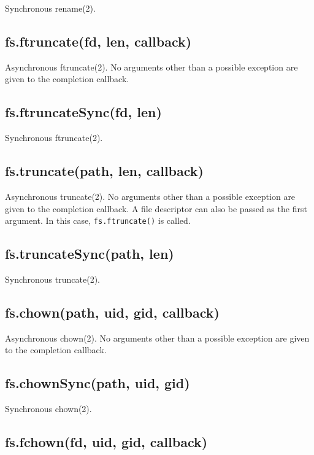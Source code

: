 Synchronous rename(2).

\subsection{fs.ftruncate(fd, len,
callback)}\label{fs.ftruncatefd-len-callback}

Asynchronous ftruncate(2). No arguments other than a possible exception
are given to the completion callback.

\subsection{fs.ftruncateSync(fd, len)}\label{fs.ftruncatesyncfd-len}

Synchronous ftruncate(2).

\subsection{fs.truncate(path, len,
callback)}\label{fs.truncatepath-len-callback}

Asynchronous truncate(2). No arguments other than a possible exception
are given to the completion callback. A file descriptor can also be
passed as the first argument. In this case, \texttt{fs.ftruncate()} is
called.

\subsection{fs.truncateSync(path, len)}\label{fs.truncatesyncpath-len}

Synchronous truncate(2).

\subsection{fs.chown(path, uid, gid,
callback)}\label{fs.chownpath-uid-gid-callback}

Asynchronous chown(2). No arguments other than a possible exception are
given to the completion callback.

\subsection{fs.chownSync(path, uid,
gid)}\label{fs.chownsyncpath-uid-gid}

Synchronous chown(2).

\subsection{fs.fchown(fd, uid, gid,
callback)}\label{fs.fchownfd-uid-gid-callback}


